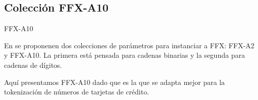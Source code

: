 %
%

\subsection{Colección FFX-A10}

\begin{frame}{FFX-A10}

  En \cite{ffx_2} se proponenen dos colecciones de parámetros para instanciar
  a FFX: FFX-A2 y FFX-A10. La primera está pensada para cadenas binarias y la
  segunda para cadenas de dígitos.

  Aquí presentamos FFX-A10 dado que es la que se adapta mejor para la
  tokenización de números de tarjetas de crédito.

\end{frame}

